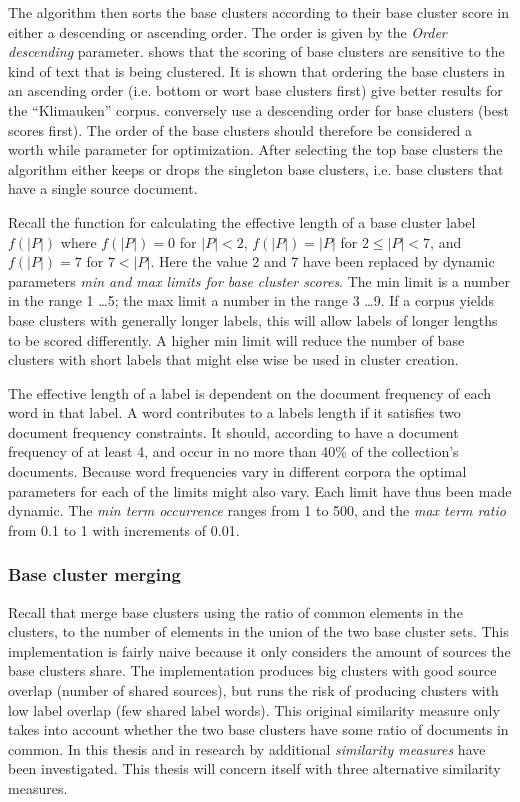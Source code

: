The algorithm then sorts the base clusters according to their base cluster score in either a descending or ascending order. The order is given by the \emph{Order descending} parameter. \cite{Moe2014} shows that the scoring of base clusters are sensitive to the kind of text that is being clustered. It is shown that ordering the base clusters in an ascending order (i.e. bottom or wort base clusters first) give better results for the ``Klimauken'' corpus. \cite{Oren1998} conversely use a descending order for base clusters (best scores first). The order of the base clusters should therefore be considered a worth while parameter for optimization. After selecting the top base clusters the algorithm either keeps or drops the singleton base clusters, i.e. base clusters that have a single source document.

Recall the function for calculating the effective length of a base cluster label \(f(\vert P \vert)\) where \(f(\vert P \vert) = 0\) for \(\vert P \vert < 2\), \(f(\vert P \vert) = \vert P \vert\) for \(2 \le \vert P \vert < 7\), and \(f(\vert P \vert) = 7\) for \(7 < \vert P \vert\). Here the value 2 and 7 have been replaced by dynamic parameters \emph{min and max limits for base cluster scores}. The min limit is a number in the range 1 \dots 5; the max limit a number in the range 3 \dots 9. If a corpus yields base clusters with generally longer labels, this will allow labels of longer lengths to be scored differently. A higher min limit will reduce the number of base clusters with short labels that might else wise be used in cluster creation.

The effective length of a label is dependent on the document frequency of each word in that label. A word contributes to a labels length if it satisfies two document frequency constraints. It should, according to \cite{Oren1998} have a document frequency of at least 4, and occur in no more than 40\% of the collection's documents. Because word frequencies vary in different corpora the optimal parameters for each of the limits might also vary. Each limit have thus been made dynamic. The \emph{min term occurrence} ranges from 1 to 500, and the \emph{max term ratio} from 0.1 to 1 with increments of 0.01.

\subsubsection{Base cluster merging}
\label{subsubsec:baseclustermerging}
Recall that \cite{Oren1998} merge base clusters using the ratio of common elements in the clusters, to the number of elements in the union of the two base cluster sets. This implementation is fairly naive because it only considers the amount of sources the base clusters share. The implementation produces big clusters with good source overlap (number of shared sources), but runs the risk of producing clusters with low label overlap (few shared label words). This original similarity measure only takes into account whether the two base clusters have some ratio of documents in common. In this thesis and in research by \citeauthor{Moe2014} additional \emph{similarity measures} have been investigated. This thesis will concern itself with three alternative similarity measures.


